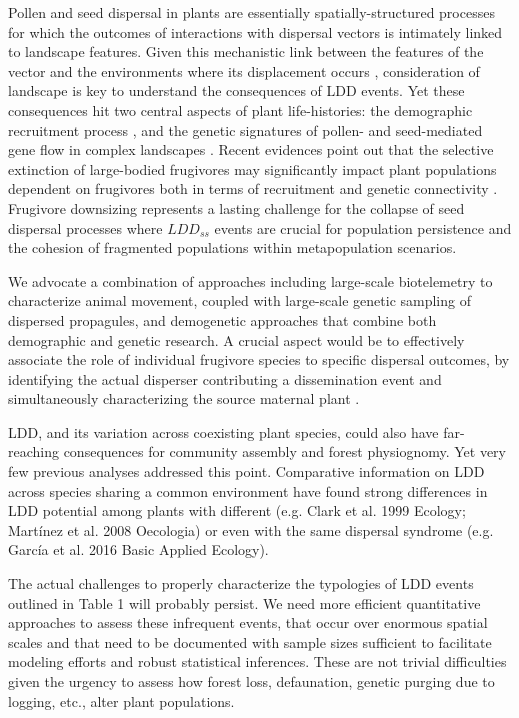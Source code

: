 \documentclass[a4paper, 12pt]{article}
\begin{document}
\begin{linenumbers}
Pollen and seed dispersal in plants are essentially spatially-structured processes for which the outcomes of interactions with dispersal vectors is intimately linked to landscape features. Given this mechanistic link between the features of the vector and the environments where its displacement occurs \citep{Nathan:2008fx}, consideration of landscape is key to understand the consequences of LDD events. Yet these consequences hit two central aspects of plant life-histories: the demographic recruitment process \citep{Harper:1977aa}, and the genetic signatures of pollen- and seed-mediated gene flow in complex landscapes \citep{Sork:1999}. Recent evidences point out that the selective extinction of large-bodied frugivores may significantly impact plant populations dependent on frugivores both in terms  of recruitment \citep{Traveset:2012he,PerezMendez:2015hya} and genetic connectivity \citep{Perez-Mendez:2016dz}. Frugivore downsizing represents a lasting challenge for the collapse of seed dispersal processes where $LDD_{ss}$ events are crucial for population persistence and the cohesion of fragmented populations within metapopulation scenarios.

We advocate \citep[also see ][]{Jordano:2002tr,Nathan:2003qe,Jones:2008il,Hardesty:2011jn} a combination of approaches including large-scale biotelemetry to characterize animal movement, coupled with large-scale genetic sampling of dispersed propagules, and demogenetic approaches that combine both demographic and genetic research. A crucial aspect would be to effectively associate the role of individual frugivore species to specific dispersal outcomes, by identifying the actual disperser contributing a dissemination event \citep{GonzalezVaro:2014ij} and simultaneously characterizing the source maternal plant \citep{Jordano:2002tr}.

LDD, and its variation across coexisting plant species, could also have far-reaching consequences for community assembly and forest physiognomy. Yet very few previous analyses addressed this point. Comparative information on LDD across species sharing a common environment have found strong differences in LDD potential among plants with different (e.g. Clark et al. 1999 Ecology; Martínez et al. 2008 Oecologia) or even with the same dispersal syndrome (e.g. García et al. 2016 Basic Applied Ecology).

The actual challenges to properly characterize the typologies of LDD events outlined in Table 1 will probably persist. We need more efficient quantitative approaches to assess these infrequent events, that occur over enormous spatial scales and that need to be documented with sample sizes sufficient to facilitate modeling efforts and robust statistical inferences. These are not trivial difficulties given the urgency to assess how forest loss, defaunation, genetic purging due to logging, etc., alter plant populations. 





\end{linenumbers}
\end{document}
